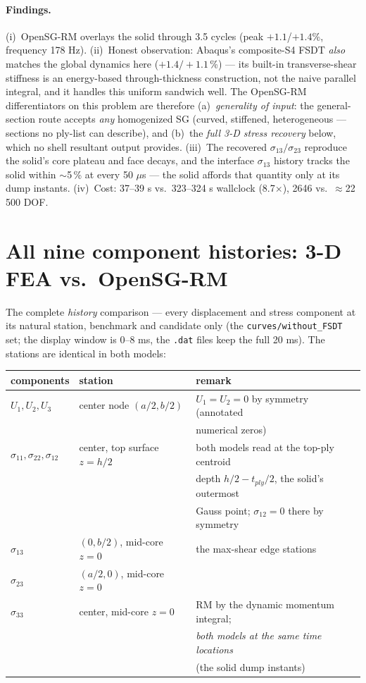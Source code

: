 \documentclass[11pt]{article}
\newcommand{\code}[1]{\texttt{#1}}
\begin{document}
\paragraph{Findings.}
(i)~OpenSG-RM overlays the solid through 3.5 cycles (peak $+1.1$/$+1.4$\%,
frequency 178 Hz).
(ii)~Honest observation: Abaqus's composite-S4 FSDT \emph{also} matches
the global dynamics here ($+1.4/{+}1.1$\,\%) --- its built-in
transverse-shear stiffness is an energy-based through-thickness
construction, not the naive parallel integral, and it handles this
uniform sandwich well.  The OpenSG-RM differentiators on this problem are
therefore (a)~\emph{generality of input}: the general-section route
accepts \emph{any} homogenized SG (curved, stiffened, heterogeneous ---
sections no ply-list can describe), and (b)~the \emph{full 3-D stress
recovery} below, which no shell resultant output provides.
(iii)~The recovered $\sigma_{13}/\sigma_{23}$ reproduce the solid's core
plateau and face decays, and the interface $\sigma_{13}$ history tracks
the solid within $\sim$5\,\% at every 50 $\mu$s --- the solid affords that
quantity only at its dump instants.  (iv)~Cost: 37--39 s vs.\ 323--324 s
wallclock (8.7$\times$), 2646 vs.\ $\approx$22\,500 DOF.

\section{All nine component histories: 3-D FEA vs.\ OpenSG-RM}
\label{sec:curves9}

The complete \emph{history} comparison --- every displacement and stress
component at its natural station, benchmark and candidate only (the
\code{curves/without\_FSDT} set; the display window is 0--8 ms, the
\code{.dat} files keep the full 20 ms).  The stations are identical in
both models:

\begin{center}\begin{tabular}{lll}\toprule
components & station & remark\\\midrule
$U_1,U_2,U_3$ & center node $(a/2,b/2)$ & $U_1{=}U_2{=}0$ by symmetry
(annotated\\ & & numerical zeros)\\
$\sigma_{11},\sigma_{22},\sigma_{12}$ & center, top surface $z=h/2$ &
both models read at the top-ply centroid\\
 & & depth $h/2{-}t_{ply}/2$, the solid's outermost\\
 & & Gauss point; $\sigma_{12}{=}0$ there by symmetry\\
$\sigma_{13}$ & $(0,b/2)$, mid-core $z{=}0$ & the max-shear edge
stations\\
$\sigma_{23}$ & $(a/2,0)$, mid-core $z{=}0$ & \\
$\sigma_{33}$ & center, mid-core $z{=}0$ & RM by the dynamic momentum
integral;\\
 & & \emph{both models at the same time locations}\\
 & & (the solid dump instants)\\
\bottomrule\end{tabular}\end{center}
\end{document}
